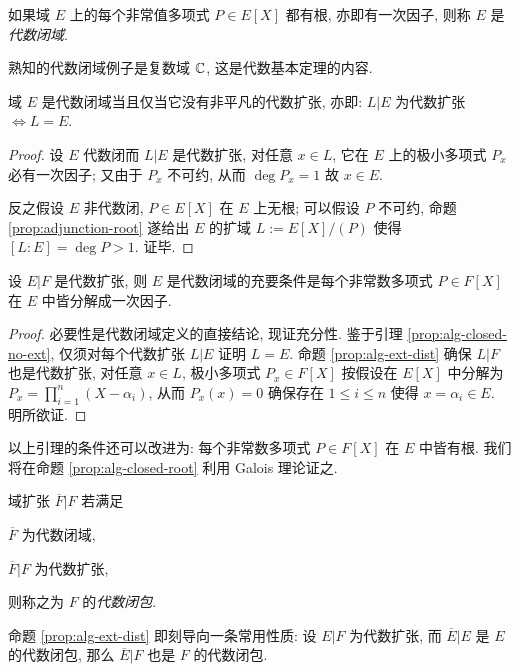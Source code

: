 \begin{definition}
	如果域 $E$ 上的每个非常值多项式 $P \in E[X]$ 都有根, 亦即有一次因子, 则称 $E$ 是\emph{代数闭域}.
\end{definition}
熟知的代数闭域例子是复数域 $\mathbb{C}$, 这是代数基本定理的内容.

\begin{lemma}\label{prop:alg-closed-no-ext}
	域 $E$ 是代数闭域当且仅当它没有非平凡的代数扩张, 亦即: $L|E$ 为代数扩张 $\iff L=E$.
\end{lemma}
\begin{proof}
	设 $E$ 代数闭而 $L|E$ 是代数扩张, 对任意 $x \in L$, 它在 $E$ 上的极小多项式 $P_x$ 必有一次因子; 又由于 $P_x$ 不可约, 从而 $\deg P_x = 1$ 故 $x \in E$.
	
	反之假设 $E$ 非代数闭, $P \in E[X]$ 在 $E$ 上无根; 可以假设 $P$ 不可约, 命题 \ref{prop:adjunction-root} 遂给出 $E$ 的扩域 $L := E[X]/(P)$ 使得 $[L:E] = \deg P > 1$. 证毕.
\end{proof}

\begin{lemma}\label{prop:alg-closed-decomp}
	设 $E|F$ 是代数扩张, 则 $E$ 是代数闭域的充要条件是每个非常数多项式 $P \in F[X]$ 在 $E$ 中皆分解成一次因子.
\end{lemma}
\begin{proof}
	必要性是代数闭域定义的直接结论, 现证充分性. 鉴于引理 \ref{prop:alg-closed-no-ext}, 仅须对每个代数扩张 $L|E$ 证明 $L=E$. 命题 \ref{prop:alg-ext-dist} 确保 $L|F$ 也是代数扩张, 对任意 $x \in L$, 极小多项式 $P_x \in F[X]$ 按假设在 $E[X]$ 中分解为 $P_x = \prod_{i=1}^n (X - \alpha_i)$, 从而 $P_x(x)=0$ 确保存在 $1 \leq i \leq n$ 使得 $x = \alpha_i \in E$. 明所欲证.
\end{proof}
以上引理的条件还可以改进为: 每个非常数多项式 $P \in F[X]$ 在 $E$ 中皆有根. 我们将在命题 \ref{prop:alg-closed-root} 利用 Galois 理论证之.

\begin{definition}
	域扩张 $\overline{F}|F$ 若满足
	\begin{inparaenum}[(i)]
		\item $\overline{F}$ 为代数闭域,
		\item $\overline{F}|F$ 为代数扩张,
	\end{inparaenum}
	则称之为 $F$ 的\emph{代数闭包}.
\end{definition}
命题 \ref{prop:alg-ext-dist} 即刻导向一条常用性质: 设 $E|F$ 为代数扩张, 而 $\overline{E}|E$ 是 $E$ 的代数闭包, 那么 $\overline{E}|F$ 也是 $F$ 的代数闭包.

